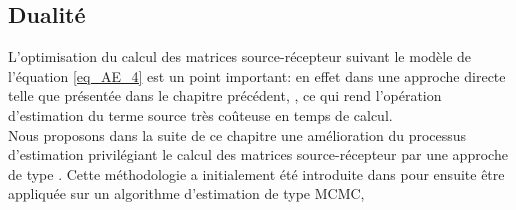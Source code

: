 \subsection{Dualité }

L'optimisation du calcul des matrices source-récepteur suivant le modèle de l'équation \eqref{eq_AE_4} est un point important: en effet dans une approche directe telle que présentée dans le chapitre précédent, , ce qui rend l'opération d'estimation du terme source très coûteuse en temps de calcul.\\

Nous proposons dans la suite de ce chapitre une amélioration du processus d'estimation privilégiant le calcul des matrices source-récepteur par une approche de type . Cette méthodologie a initialement été introduite dans \cite{Keats2007} pour ensuite être appliquée sur un algorithme d'estimation de type MCMC, \\

